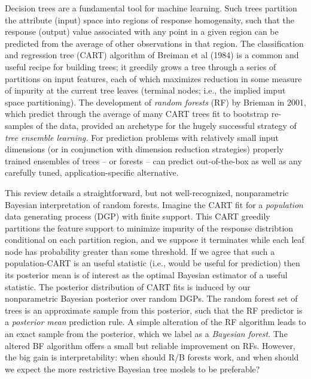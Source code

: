 \documentclass[12pt]{article}
\begin{document}
Decision trees are a fundamental tool for machine learning. Such trees
partition the attribute (input) space into regions of response
homogenaity, such that the response (output) value associated with any
point in a given region can be predicted from the average of other
observations in that region. The classification and regression tree
(CART) algorithm of Breiman et al (1984) is a common and useful recipe
for building trees; it greedily grows a tree through a series of
partitions on input features, each of which maximizes reduction in some
measure of inpurity at the current tree leaves (terminal nodes; i.e.,
the implied imput space partitioning). The development of \emph{random
forests} (RF) by Brieman in 2001, which predict through the average of
many CART trees fit to bootstrap re-samples of the data, provided an
archetype for the hugely successful strategy of \emph{tree ensemble
learning.} For prediction problems with relatively small input
dimensions (or in conjunction with dimension reduction strategies)
properly trained ensembles of trees -- or forests -- can predict
out-of-the-box as well as any carefully tuned, application-specific
alternative.

This review details a straightforward, but not well-recognized,
nonparametric Bayesian interpretation of random forests. Imagine the
CART fit for a \emph{population} data generating process (DGP) with
finite support. This CART greedily partitions the feature support to
minimize impurity of the response distribtion conditional on each
partition region, and we suppose it terminates while each leaf node has
probability greater than some threshold. If we agree that such a
population-CART is an useful statistic (i.e., would be useful for
prediction) then its posterior mean is of interest as the optimal
Bayesian estimator of a useful statistic. The posterior distribution of
CART fits is induced by our nonparametric Bayesian posterior over random
DGPs. The random forest set of trees is an approximate sample from this
posterior, such that the RF predictor is a \emph{posterior mean}
prediction rule. A simple alteration of the RF algorithm leads to an
exact sample from the posterior, which we label as a \emph{Bayesian
forest}. The altered BF algorithm offers a small but reliable
improvement on RFs. However, the big gain is interpretability: when
should R/B forests work, and when should we expect the more restrictive
Bayesian tree models to be preferable?
\end{document}
